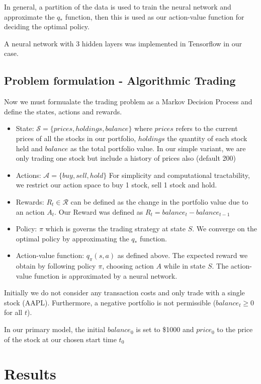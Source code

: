 \documentclass[12pt]{article}
\begin{document}
In general, a partition of the data is used to train the neural network and approximate the $q_{*}$ function, then this is used as our action-value function for deciding the optimal policy.

A neural network with 3 hidden layers was implemented in Tensorflow in our case.


\subsection{Problem formulation - Algorithmic Trading}
Now we must formualate the trading problem as a Markov Decision Process and define the states, actions and rewards.

\begin{itemize}
	\item State: $\mathcal{S} = \{prices,holdings,balance\} $ where $prices$ refers to the current prices of all the stocks in our portfolio, $holdings$ the quantity of each stock held and $balance$ as the total portfolio value. In our simple variant, we are only trading one stock but include a history of prices also (default 200)
	\item Actions: $\mathcal{A} = \{buy,sell,hold\}$ For simplicity and computational tractability, we restrict our action space to buy 1 stock, sell 1 stock and hold.
	\item Rewards: $R_{t} \in \mathcal{R}$ can be defined as the change in the portfolio value due to an action $A_{t}$. Our Reward was defined as $R_{t} = balance_{t} - balance_{t-1}$
	\item Policy: $\pi$ which is governs the trading strategy at state $S$. We converge on the optimal policy by approximating the $q_{*}$ function.
	\item Action-value function: $q_{\pi}(s,a)$ as defined above. The expected reward we obtain by following policy $\pi$, choosing action $A$ while in state $S$. The action-value function is approximated by a neural network.
\end{itemize}

Initially we do not consider any transaction costs and only trade with a single stock (AAPL). Furthermore, a negative portfolio is not permissible ($balance_{t} \geq 0$ for all $t$).

In our primary model, the initial $balance_{0}$ is set to \$1000 and $price_{0}$ to the price of the stock at our chosen start time $t_{0}$ 




\section{Results}
\end{document}
